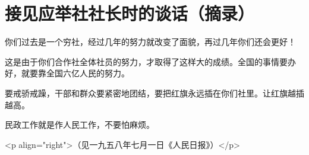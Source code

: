 \section[接见应举社社长时的谈话（摘录）（一九五八年六月）]{接见应举社社长时的谈话（摘录）}


你们过去是一个穷社，经过几年的努力就改变了面貌，再过几年你们还会更好！

这是由于你们合作社全体社员的努力，才取得了这样大的成绩。全国的事情要办好，就要靠全国六亿人民的努力。

要戒骄戒躁，干部和群众要紧密地团结，要把红旗永远插在你们社里。让红旗越插越高。

民政工作就是作人民工作，不要怕麻烦。

<p align="right">（见一九五八年七月一日《人民日报》）</p>


